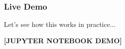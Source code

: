\documentclass{beamer}
\begin{document}
\begin{frame}
\frametitle{Live Demo}

\begin{center}
\LARGE{Let's see how this works in practice...}

\vspace{1cm}
\textbf{[JUPYTER NOTEBOOK DEMO]}
\end{center}
\end{frame}
\end{document}
